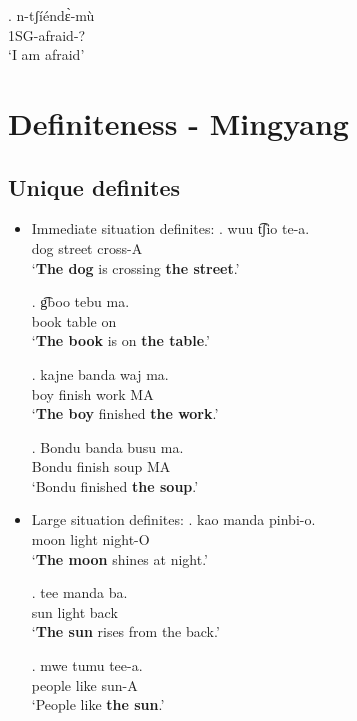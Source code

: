 \documentclass{assets/fieldnotes}
\begin{document}
\exg. n-tʃíéndɛ̀-mù\\
1SG-afraid-?\\
`I am afraid'



\section{Definiteness - Mingyang}
\subsection{Unique definites}
\begin{itemize}
    \item Immediate situation definites:
    \exg. wuu t͡ʃio te-a.\\
    dog street cross-A\\
    `\textbf{The dog} is crossing \textbf{the street}.'

    \exg. g͡boo tebu ma.\\
    book table on\\   
    `\textbf{The book} is on \textbf{the table}.'

    \exg. kajne banda waj ma.\\
    boy finish work MA\\
    `\textbf{The boy} finished \textbf{the work}.'
    
    \exg. Bondu banda busu ma.\\
    Bondu finish soup MA\\
    `Bondu finished \textbf{the soup}.'


    \item Large situation definites:
    \exg. kao manda pinbi-o.\\
        moon light night-O\\
    `\textbf{The moon} shines at night.'

    \exg. tee manda ba.\\
        sun light back\\
        `\textbf{The sun} rises from the back.'
        
    \exg. mwe tumu tee-a.\\
        people like sun-A\\
        `People like \textbf{the sun}.'



\end{itemize}
\end{document}
